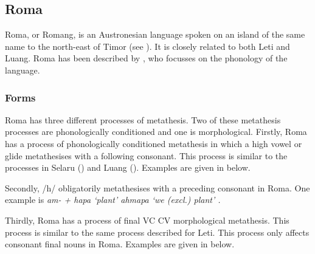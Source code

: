\subsection{Roma}\label{sec:Rom}
Roma, or Romang, is an Austronesian language spoken on an
island of the same name to the
north-east of Timor (see ).
It is closely related to both Leti and Luang.
Roma has been described by \cite{st91},
who focusses on the phonology of the language.

\subsubsection{Forms}
Roma has three different processes of metathesis.
Two of these metathesis processes are phonologically conditioned and one is morphological.
Firstly, Roma has a process of phonologically conditioned metathesis
in which a high vowel or glide metathesises with a following consonant.
This process is similar to the processes in Selaru () and Luang ().
Examples are given in  below.

\begin{exe}
	\label{ex:RomPhoMet}
\end{exe}

Secondly, /h/ obligatorily metathesises with a preceding consonant in Roma.
One example is \it{am-}  + \it{hapa} `plant'
{\ra} \it{ahmapa} `we (excl.) plant' \citep[69]{st91}.

Thirdly, Roma has a process of final VC {\ra} CV morphological metathesis.
This process is similar to the same process described for Leti.
This process only affects consonant final nouns in Roma.
Examples are given in  below.

